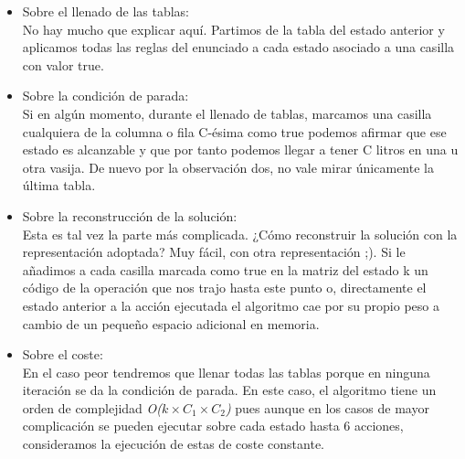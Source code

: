 \documentclass[12pt]{article}
\begin{document}
\begin{itemize}
    \item Sobre el llenado de las tablas: \\
          No hay mucho que explicar aquí. Partimos de la tabla del estado anterior y aplicamos
          todas las reglas del enunciado a cada estado asociado a una casilla con valor true.
    \item Sobre la condición de parada: \\
          Si en algún momento, durante el llenado de tablas, marcamos una casilla cualquiera de
          la columna o fila C-ésima como true podemos afirmar que ese estado es alcanzable y que
          por tanto podemos llegar a tener C litros en una u otra vasija. De nuevo por la 
          observación dos, no vale mirar únicamente la última tabla.
    \item Sobre la reconstrucción de la solución: \\
          Esta es tal vez la parte más complicada. ¿Cómo reconstruir la solución con la 
          representación adoptada? Muy fácil, con otra representación ;). Si le añadimos
          a cada casilla marcada como true en la matriz del estado k un código de la operación
          que nos trajo hasta este punto o, directamente el estado anterior a la acción ejecutada
          el algoritmo cae por su propio peso a cambio de un pequeño espacio adicional en memoria.
    \item Sobre el coste: \\
          En el caso peor tendremos que llenar todas las tablas porque en ninguna iteración se
          da la condición de parada. En este caso, el algoritmo tiene un orden de complejidad
          \textit{O($k \times C_1 \times C_2$)} pues aunque en los casos de mayor complicación
          se pueden ejecutar sobre cada estado hasta 6 acciones, consideramos la ejecución de 
          estas de coste constante.
    
\end{itemize}

\end{document}
